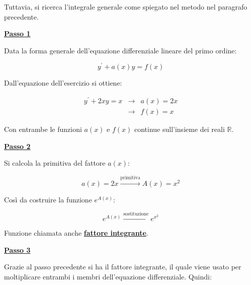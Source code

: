 \documentclass[a4paper]{article}
\begin{document}
	\noindent
	Tuttavia, si ricerca l'integrale generale come spiegato nel metodo nel paragrafo precedente.\newline
	
	\noindent
	\textcolor{Red3}{\textbf{\underline{Passo 1}}}\newline
	
	\noindent
	Data la  forma generale dell'equazione differenziale lineare del primo ordine:
	
	\begin{equation*}
		y^{'} + a\left(x\right) y = f\left(x\right)
	\end{equation*}

	\noindent
	Dall'equazione dell'esercizio si ottiene:
	
	\begin{equation*}
		\begin{array}{lll}
			y^{'} + 2xy = x & \longrightarrow	& a\left(x\right) = 2x \\
							& \longrightarrow	& f\left(x\right) = x
		\end{array}
	\end{equation*}

	\noindent
	Con entrambe le funzioni $a\left(x\right)$ e $f\left(x\right)$ continue sull'insieme dei reali $\mathbb{R}$.\newline
	
	\noindent
	\textcolor{Red3}{\textbf{\underline{Passo 2}}}\newline
	
	\noindent
	Si calcola la primitiva del fattore $a\left(x\right)$:
	
	\begin{equation*}
		a\left(x\right) = 2x \xrightarrow{\text{primitiva}} A\left(x\right) = x^{2}
	\end{equation*}

	\noindent
	Così da costruire la funzione $e^{A\left(x\right)}$:
	
	\begin{equation*}
		e^{A\left(x\right)} \xrightarrow{\text{sostituzione}} e^{x^{2}}
	\end{equation*}

	\noindent
	Funzione chiamata anche \textbf{\underline{fattore integrante}}.\newline
	
	\noindent
	\textcolor{Red3}{\textbf{\underline{Passo 3}}}\newline
	
	\noindent
	Grazie al passo precedente si ha il fattore integrante, il quale viene usato per moltiplicare entrambi i membri dell'equazione differenziale. Quindi:
	
\end{document}
